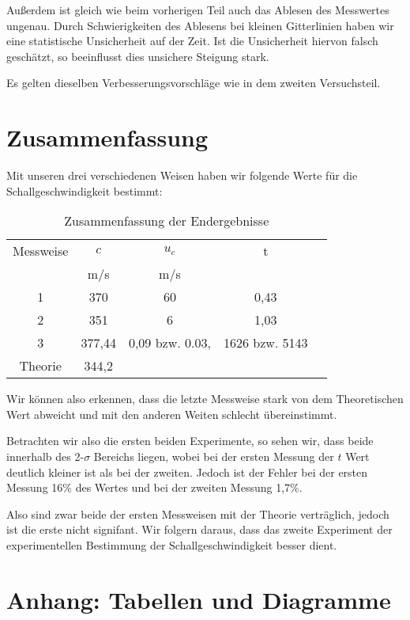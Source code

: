 \documentclass[11pt,a4paper]{article}
\begin{document}
Au\ss erdem ist gleich wie beim vorherigen Teil auch das Ablesen des Messwertes ungenau. Durch Schwierigkeiten des Ablesens bei kleinen Gitterlinien haben wir eine statistische Unsicherheit auf der Zeit. Ist die Unsicherheit hiervon falsch gesch\"atzt, so beeinflusst dies unsichere Steigung stark.

Es gelten dieselben Verbesserungsvorschläge wie in dem zweiten Versuchsteil. 

\pagebreak

\section{Zusammenfassung}

Mit unseren drei verschiedenen Weisen haben wir folgende Werte f\"ur die Schallgeschwindigkeit bestimmt:

\begin{table}[h]
	\centering
	\begin{tabular*}{0.50\textwidth}{@{\extracolsep{\fill}}ccccc}
		\toprule
		Messweise & $c$ & $u_c$ & t\\
		& m/s&m/s &\\
		1 & 370 & 60 & 0,43 \\
		2 & 351 & 6 & 1,03\\
		3 & 377,44 & 0,09 bzw. 0.03, & 1626 bzw. 5143\\
		Theorie & 344,2 & \\
		\bottomrule
	\end{tabular*}
	\caption{Zusammenfassung der Endergebnisse}
\label{Table3}
\end{table}

Wir k\"onnen also erkennen, dass die letzte Messweise stark von dem Theoretischen Wert abweicht und mit den anderen Weiten schlecht \"ubereinstimmt.

Betrachten wir also die ersten beiden Experimente, so sehen wir, dass beide innerhalb des 2-$\sigma$ Bereichs liegen, wobei bei der ersten Messung der $t$ Wert deutlich kleiner ist als bei der zweiten. Jedoch ist der Fehler bei der ersten Messung 16\% des Wertes und bei der zweiten Messung 1,7\%.

Also sind zwar beide der ersten Messweisen mit der Theorie vertr\"aglich, jedoch ist die erste nicht signifant. Wir folgern daraus, dass das zweite Experiment der experimentellen Bestimmung der Schallgeschwindigkeit besser dient.



\section{Anhang: Tabellen und Diagramme}
\end{document}
